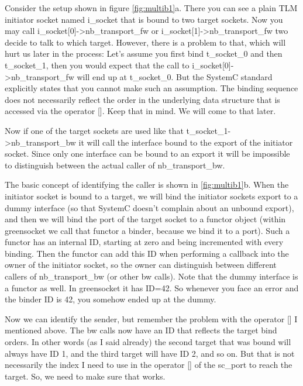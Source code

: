 \documentclass[a4paper,10pt]{article}          %
\newcommand{\code}[1]{{\ttfamily#1}}
\begin{document}
Consider the setup shown in figure \ref{fig:multib1}a. There you can see a plain TLM initiator socket named \code{i\_socket} that is bound to two target sockets. Now you may call \code{i\_socket[0]->nb\_transport\_fw} or  \code{i\_socket[1]->nb\_transport\_fw} two decide to talk to which target. However, there is a problem to that, which will hurt us later in the process: Let's assume you first bind \code{t\_socket\_0} and then \code{t\_socket\_1}, then you would expect that the call to  \code{i\_socket[0]->nb\_transport\_fw} will end up at \code{t\_socket\_0}. But the SystemC standard explicitly states that you cannot make such an assumption. The binding sequence does not necessarily reflect the order in the underlying data structure that is accessed via the \code{operator []}. Keep that in mind. We will come to that later.

Now if one of the target sockets are used like that \code{t\_socket\_1->nb\_transport\_bw} it will call the interface bound to the export of the initiator socket. Since only one interface can be bound to an export it will be impossible to distinguish between the actual caller of \code{nb\_transport\_bw}. 

The basic concept of identifying the caller is shown in \ref{fig:multib1}b.
When the initiator socket is bound to a target, we will bind the initiator sockets export to a dummy interface (so that SystemC doesn't complain about an unbound export), and then we will bind the port of the target socket to a functor object (within greensocket we call that functor a binder, because we bind it to a port). Such a functor has an internal ID, starting at zero and being incremented with every binding. Then the functor can add this ID when performing a callback into the owner of the initiator socket, so the owner can distinguish between different callers of \code{nb\_transport\_bw} (or other bw calls). Note that the dummy interface is a functor as well. In greensocket it has ID=42. So whenever you face an error and the binder ID is 42, you somehow ended up at the dummy.

Now we can identify the sender, but remember the problem with the \code{operator []} I mentioned above. The bw calls now have an ID that reflects the target bind orders. In other words (as I said already) the second target that was bound will always have ID 1, and the third target will have ID 2, and so on. But that is not necessarily the index I need to use in the \code{operator []} of the \code{sc\_port} to reach the target. So, we need to make sure that works.
\end{document}
